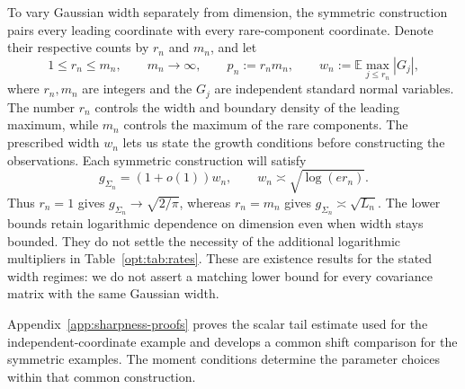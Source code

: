\documentclass[11pt,letterpaper]{article}
\theoremstyle{remark}
\newcommand{\E}{\mathbb E}
\begin{document}
To vary Gaussian width separately from dimension, the symmetric
construction pairs every leading coordinate with every rare-component
coordinate. Denote their respective counts by $r_n$ and $m_n$, and let
\begin{equation}
 1\le r_n\le m_n,\qquad m_n\to\infty,\qquad p_n:=r_nm_n,
 \qquad w_n:=\E\max_{j\le r_n}|G_j|,
 \label{lower:eq:dimensions}
\end{equation}
where $r_n,m_n$ are integers and the $G_j$ are independent standard
normal variables. The number $r_n$ controls the width and boundary
density of the leading maximum, while $m_n$ controls the maximum
of the rare components. The prescribed width $w_n$ lets us state
the growth conditions before constructing the observations.
Each symmetric construction will satisfy
\begin{equation}
 g_{\Sigma_n}=(1+o(1))w_n,\qquad
 w_n\asymp\sqrt{\log(er_n)}.
 \label{lower:eq:width-profile}
\end{equation}
Thus $r_n=1$ gives $g_{\Sigma_n}\to\sqrt{2/\pi}$, whereas
$r_n=m_n$ gives $g_{\Sigma_n}\asymp\sqrt{L_n}$.
The lower bounds retain logarithmic dependence on dimension even
when width stays bounded. They do not settle the necessity of the
additional logarithmic multipliers in Table~\ref{opt:tab:rates}.
These are existence results for the stated width regimes: we do
not assert a matching lower bound for every covariance matrix
with the same Gaussian width.

Appendix~\ref{app:sharpness-proofs} proves the scalar tail estimate
used for the independent-coordinate example and develops a common
shift comparison for the symmetric examples. The moment conditions
determine the parameter choices within that common construction.
\end{document}
